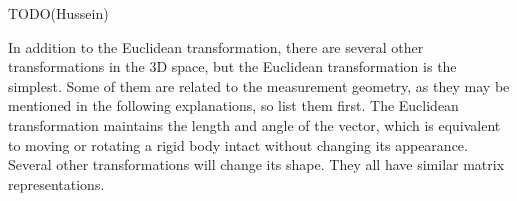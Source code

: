 %
TODO(Hussein)

In addition to the Euclidean transformation, there are several other transformations in the 3D space, but the Euclidean transformation is the simplest. Some of them are related to the measurement geometry, as they may be mentioned in the following explanations, so list them first. The Euclidean transformation maintains the length and angle of the vector, which is equivalent to moving or rotating a rigid body intact without changing its appearance. Several other transformations will change its shape. They all have similar matrix representations.

